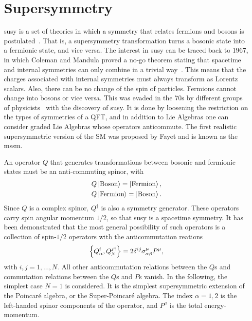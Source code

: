 \clearpage
\section{Supersymmetry}

\gls{susy} is a set of theories in which a symmetry that relates fermions and bosons is postulated~\cite{Peskin2019-bt,Garrett_2011,MARTIN_1998}. That is, a supersymmetry transformation turns a bosonic state into a fermionic state, and vice versa. The interest in \gls{susy} can be traced back to 1967, in which Coleman and Mandula proved a no-go theorem stating that spacetime and internal symmetries can only combine in a trivial way~\cite{PhysRev.159.1251}. This means that the charges associated with internal symmetries must always transform as Lorentz scalars. Also, there can be no change of the spin of particles. Fermions cannot change into bosons or vice versa. This was evaded in the 70s by different groups of physicists~\cite{GERVAIS1971632,HAAG1975257} with the discovery of \gls{susy}. It is done by loosening the restriction on the types of symmetries of a QFT, and in addition to Lie Algebras one can consider graded Lie Algebras whose operators anticommute. The first realistic supersymmetric version of the SM was proposed by Fayet and is known as the \gls{mssm}.

An operator $Q$ that generates transformations between bosonic and fermionic states must be an anti-commuting spinor, with
\begin{equation}
\begin{split}
Q\ket{\text{Boson}}=\ket{\text{Fermion}},\\
Q\ket{\text{Fermion}}=\ket{\text{Boson}}.
\end{split}
\end{equation}
Since $Q$ is a complex spinor, $Q^\dagger$ is also a symmetry generator. These operators carry spin angular momentum $1/2$, so that \gls{susy} is a spacetime symmetry. It has been demonstrated that the most general possibility of such operators is a collection of spin-$1/2$ operators with the anticommutation reations
\begin{equation}
\pb{Q^i_\alpha}{Q^{j\dagger}_\beta}=2\delta^{ij}\sigma^\mu_{\alpha\beta}P^\mu,
\end{equation}
with $i,j=1,\ldots,N$. All other anticommutation relations between the $Q$s and commutation relations between the $Q$s and $P$s vanish. In the following, the simplest case $N=1$ is considered. It is the simplest supersymmetric extension of the Poincaré algebra, or the Super-Poincaré algebra. The index $\alpha=1,2$ is the left-handed spinor components of the operator, and $P^\mu$ is the total energy-momentum. 

